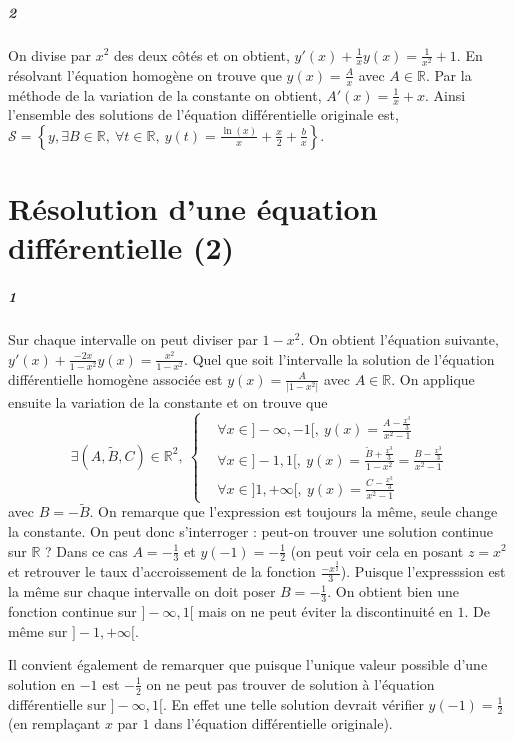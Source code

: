 \documentclass[10pt,a4paper]{article}
\begin{document}
\subparagraph{2}On divise par $x^2$ des deux côtés et on obtient, $y'(x) + \frac{1}{x}y(x) = \frac{1}{x^2}+1$. En résolvant l'équation homogène on trouve que $y(x) = \frac{A}{x}$ avec $A \in \mathbb{R}$. Par la méthode de la variation de la constante on obtient, $A'(x) = \frac{1}{x}+x$. Ainsi l'ensemble des solutions de l'équation différentielle originale est, ${\mathcal{S} = \left\lbrace y, \exists B \in \mathbb{R}, \ \forall t \in \mathbb{R}, \ y(t) = \frac{\ln(x)}{x} + \frac{x}{2} + \frac{b}{x} \right\rbrace}$.

\section{Résolution d'une équation différentielle (2)}
\subparagraph{1}Sur chaque intervalle on peut diviser par $1-x^2$. On obtient l'équation suivante, $y'(x) + \frac{-2x}{1-x^2}y(x) = \frac{x^2}{1-x^2}$. Quel que soit l'intervalle la solution de l'équation différentielle homogène associée est $y(x) = \frac{A}{\vert 1-x^2 \vert}$ avec $A \in \mathbb{R}$. On applique ensuite la variation de la constante et on trouve que
\begin{equation*}
\exists (A,\tilde{B},C) \in \mathbb{R}^2, \ \left\lbrace
\begin{aligned}
&\forall x \in ]-\infty,-1[, \ y(x) = \frac{A - \frac{x^3}{3}}{x^2 - 1} \\
&\forall x \in ]-1,1[, \ y(x) = \frac{\tilde{B} + \frac{x^3}{3}}{1- x^2} =  \frac{B - \frac{x^3}{3}}{x^2-1}\\
&\forall x \in ]1,+\infty[, \ y(x) = \frac{C - \frac{x^3}{3}}{x^2 - 1}
\end{aligned}
\right.
\end{equation*}
avec $B = -\tilde{B}$. On remarque que l'expression est toujours la même, seule change la constante. On peut donc s'interroger : peut-on trouver une solution continue sur $\mathbb{R}$ ? Dans ce cas $A = -\frac{1}{3}$ et $y(-1) = -\frac{1}{2}$ (on peut voir cela en posant $z = x^2$ et retrouver le taux d'accroissement de la fonction $\frac{-x^{\frac{3}{2}}}{3}$). Puisque l'expresssion est la même sur chaque intervalle on doit poser $B = -\frac{1}{3}$. On obtient bien une fonction continue sur $]-\infty,1[$ mais on ne peut éviter la discontinuité en $1$. De même sur $]-1,+\infty[$.

Il convient également de remarquer que puisque l'unique valeur possible d'une solution en $-1$ est $-\frac{1}{2}$ on ne peut pas trouver de solution à l'équation différentielle sur $]-\infty,1[$. En effet une telle solution devrait vérifier $y(-1) = \frac{1}{2}$ (en remplaçant $x$ par $1$ dans l'équation différentielle originale).
\end{document}
